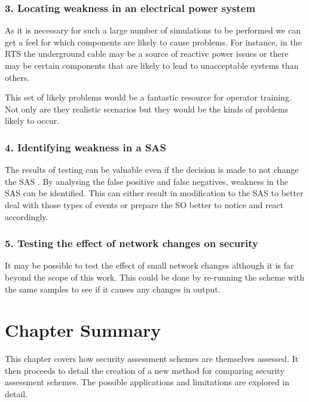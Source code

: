 \documentclass[a4paper,oneside,12pt]{report}
\begin{document}
\subsubsection{3. Locating weakness in an electrical power system}

As it is necessary for such a large number of simulations to be performed we can get a feel for which components are likely to cause problems. For instance, in the RTS the underground cable may be a source of reactive power issues or there may be certain components that are likely to lead to unacceptable systems than others.

This set of likely problems would be a fantastic resource for operator training. Not only are they realistic scenarios but they would be the kinds of problems likely to occur.

\subsubsection{4. Identifying weakness in a SAS}

The results of testing can be valuable even if the decision is made to not change the SAS . By analysing the false positive and false negatives, weakness in the SAS can be identified. This can either result in modification to the SAS to better deal with those types of events or prepare the SO better to notice and react accordingly.

\subsubsection{5. Testing the effect of network changes on security}

It may be possible to test the effect of small network changes although it is far beyond the scope of this work. This could be done by re-running the scheme with the same samples to see if it causes any changes in output.


\section{Chapter Summary}

This chapter covers how security assessment schemes are themselves assessed. It then proceeds to detail the creation of a new method for comparing security assessment schemes. The possible applications and limitations are explored in detail.


\end{document}
